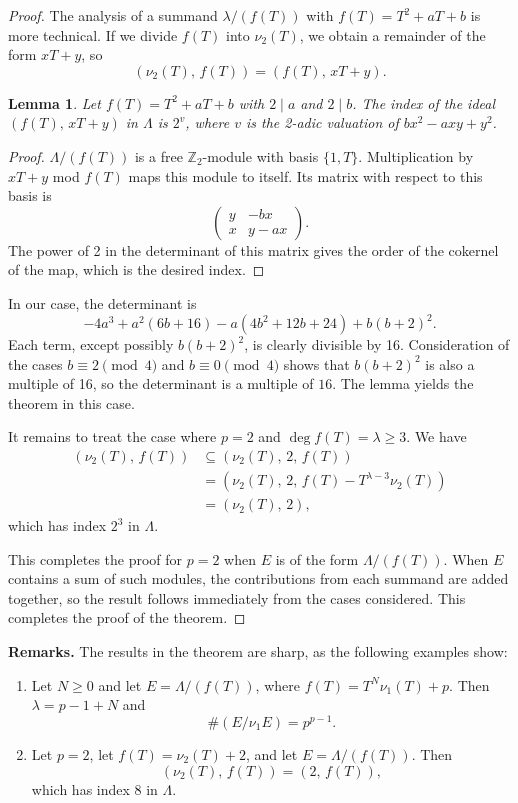 \documentclass{amsart}
\newtheorem{lemma}[theorem]{Lemma}
\begin{document}
\begin{proof}
The analysis of a summand $\lambda/(f(T))$ with $f(T)=T^2+aT+b$ is more technical. If we divide 
$f(T)$ into $\nu_2(T)$, we obtain a remainder of the form $xT+y$, so
$$
(\nu_2(T), \, f(T)) = (f(T),\,  xT+y).
$$
\begin{lemma} Let $f(T)=T^2+aT+b$ with $2\mid a$ and $2\mid b$.
The index of the ideal $(f(T),\,  xT+y)$ in $\Lambda$ is $2^v$, where $v$ is the 2-adic valuation of
$bx^2-axy+y^2$.
\end{lemma}
\begin{proof} $\Lambda/(f(T))$ is a free $\mathbb Z_2$-module with basis $\{1, T\}$. Multiplication by
$xT+y$ mod $f(T)$ maps this module to itself. Its matrix with respect to this basis is
$$
\begin{pmatrix} y & -bx \\ x & y-ax\end{pmatrix}.
$$
The power of 2 in the determinant of this matrix gives the order of the cokernel of the map, which is the desired index.
\end{proof}
In our case, the determinant is
$$
-4a^3+a^2(6b+16)-a(4b^2+12b+24) + b(b+2)^2.
$$
Each term, except possibly $b(b+2)^2$, is clearly divisible by 16.
Consideration of the cases $b\equiv 2\pmod 4$ and $b\equiv 0 \pmod 4$ shows that $b(b+2)^2$ is also
a multiple of 16, so the determinant is a multiple of $16$. The lemma yields the theorem in this case.


It remains to treat the case where $p=2$ and  $\deg f(T) = \lambda\ge 3$. 
We have
\begin{align*}
(\nu_2(T),\, f(T)) & \subseteq (\nu_2(T),\, 2,\, f(T))\\
&= (\nu_2(T),\, 2, \, f(T)-T^{\lambda-3} \nu_2(T))\\
&= (\nu_2(T),\, 2),
\end{align*}
which has index $2^{3}$ in $\Lambda$.

This completes the proof for $p=2$ when $E$ is of the form $\Lambda/(f(T))$. When $E$ contains a sum of
such modules, the contributions from each summand are added together, so
the result follows immediately from the cases considered. This completes the proof of the theorem. \end{proof}

 {\bf Remarks.} The results in the theorem are sharp, as the following examples show:
\begin{enumerate}
\item Let $N\ge 0$ and let $E=\Lambda/(f(T))$, where $f(T)=T^N \nu_1(T) + p$. Then 
$\lambda = p-1+N$ and
$$
 \#(E/\nu_1E) = p^{p-1}.
$$
\item Let $p=2$, let $f(T) = \nu_2(T) + 2$, and let $E=\Lambda/(f(T))$. Then 
$$
(\nu_2(T), \, f(T)) = (2, \, f(T)), $$
which has index 8 in $\Lambda$. 
\end{enumerate}
\end{document}
